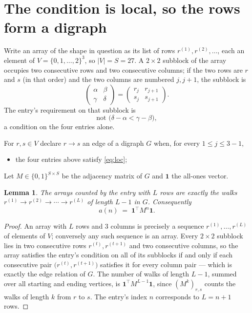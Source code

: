 \documentclass[11pt,a4paper]{article}
\theoremstyle{plain}
\newtheorem{lemma}[theorem]{Lemma}
\theoremstyle{definition}
\begin{document}
\section{The condition is local, so the rows form a digraph}

Write an array of the shape in question as its list of rows
$r^{(1)},r^{(2)},\dots$, each an element of
$V=\{0,1,\dots,2\}^{3}$, so $|V|=S=27$. A $2\times2$ subblock of the array
occupies two consecutive rows and two consecutive columns; if the two rows are $r$
and $s$ (in that order) and the two columns are numbered $j,j+1$,
the subblock is
\[
\begin{pmatrix}\alpha&\beta\\\gamma&\delta\end{pmatrix}=\begin{pmatrix}r_j&r_{j+1}\\s_j&s_{j+1}\end{pmatrix}.
\]
The entry's requirement on that subblock is
\begin{equation}\label{eq:loc}
\text{not }\bigl(\delta-\alpha<\gamma-\beta\bigr),
\end{equation}
a condition on the four entries alone.

For $r,s\in V$ declare $r\to s$ an edge of a digraph $G$ when, for every
$1\le j\le 3-1$,
\begin{itemize}
\item the four entries above satisfy \eqref{eq:loc};

\end{itemize}
Let $M\in\{0,1\}^{S\times S}$ be the adjacency matrix of $G$ and $\mathbf{1}$ the
all-ones vector.

\begin{lemma}\label{lem:walk}
The arrays counted by the entry with $L$ rows are exactly the walks
$r^{(1)}\to r^{(2)}\to\cdots\to r^{(L)}$ of length $L-1$ in $G$. Consequently
\[
a(n)\;=\;\mathbf{1}^{\!\top}M^{n}\mathbf{1} .
\]
\end{lemma}

\begin{proof}
An array with $L$ rows and $3$ columns is precisely a sequence
$r^{(1)},\dots,r^{(L)}$ of elements of $V$; conversely any such sequence is an array.
Every $2\times2$ subblock lies in two consecutive rows $r^{(t)},r^{(t+1)}$ and two
consecutive columns, so the array satisfies the entry's condition on all of its subblocks
if and only if each consecutive pair $\bigl(r^{(t)},r^{(t+1)}\bigr)$ satisfies it for
every column pair --- which is exactly the edge relation of $G$. The number of walks of
length $L-1$, summed over all starting and ending vertices, is
$\mathbf{1}^{\!\top}M^{L-1}\mathbf{1}$, since $(M^{k})_{r,s}$ counts the walks of
length $k$ from $r$ to $s$. The entry's index $n$ corresponds to $L=n+1$ rows.
\end{proof}
\end{document}
